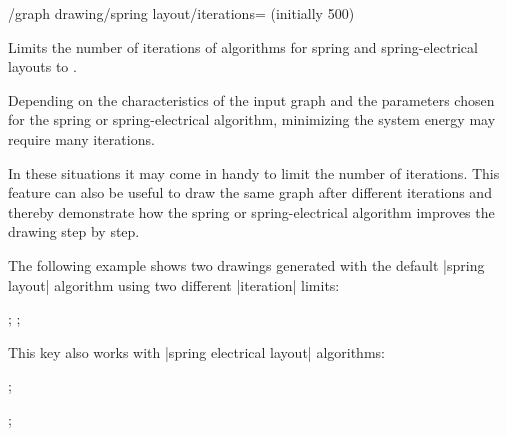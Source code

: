 \begin{key}{/graph drawing/spring layout/iterations=
  (initially 500)}

  Limits the number of iterations of algorithms for spring and 
  spring-electrical layouts to .

  Depending on the characteristics of the input graph and the parameters
  chosen for the spring or spring-electrical algorithm, minimizing the
  system energy may require many iterations.

  In these situations it may come in handy to limit the number of
  iterations. This feature can also be useful to draw the same graph
  after different iterations and thereby demonstrate how the spring or
  spring-electrical algorithm improves the drawing step by step.

  The following example shows two drawings generated with the default
  |spring layout| algorithm using two different |iteration| limits:
  \begin{codeexample}[]
\tikz {};
\tikz {};
  \end{codeexample}

  This key also works with |spring electrical layout| algorithms:
  \begin{codeexample}[width=5cm]
\tikz {};

\tikz {};
  \end{codeexample}
\end{key}

